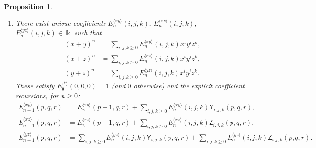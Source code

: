 \documentclass{amsart}
\newtheorem{proposition}[theorem]{Proposition}
\theoremstyle{definition}
\theoremstyle{remark}
\numberwithin{equation}{section}
\begin{document}
\begin{proposition}
\begin{enumerate}
\item[\rm (5)] There exist unique coefficients $E^{\langle xy\rangle}_{n}(i,j,k)$, $E^{\langle xz\rangle}_{n}(i,j,k)$, $E^{\langle yz\rangle}_{n}(i,j,k)\in\Bbbk$ such that
\begin{align}
(x+y)^n&=\sum_{i,j,k\ge 0}E^{\langle xy\rangle}_{n}(i,j,k)x^i y^j z^k,\label{Exycase4}\\
(x+z)^n&=\sum_{i,j,k\ge 0}E^{\langle xz\rangle}_{n}(i,j,k)x^i y^j z^k,\label{Exzcase4}\\
(y+z)^n&=\sum_{i,j,k\ge 0}E^{\langle yz\rangle}_{n}(i,j,k)x^i y^j z^k.\label{Eyzcase4}
\end{align}
These satisfy $E^{\langle\ast\rangle}_{0}(0,0,0)=1$ {\rm (}and $0$ otherwise{\rm )} and the explicit coefficient recursions, for $n\ge 0$:
\begin{equation}\label{binreccase4}
\begin{aligned}
E^{\langle xy\rangle}_{n+1}(p,q,r) & = E^{\langle xy\rangle}_{n}(p-1,q,r)+\sum_{i,j,k\ge 0}E^{\langle xy\rangle}_{n}(i,j,k)\mathsf Y_{i,j,k}(p,q,r),\\
E^{\langle xz\rangle}_{n+1}(p,q,r) & = E^{\langle xz\rangle}_{n}(p-1,q,r)+\sum_{i,j,k\ge 0}E^{\langle xz\rangle}_{n}(i,j,k)\mathsf Z_{i,j,k}(p,q,r),\\
E^{\langle yz\rangle}_{n+1}(p,q,r) & = \sum_{i,j,k\ge 0}E^{\langle yz\rangle}_{n}(i,j,k)\mathsf Y_{i,j,k}(p,q,r) +\sum_{i,j,k\ge 0}E^{\langle yz\rangle}_{n}(i,j,k)\mathsf Z_{i,j,k}(p,q,r).
\end{aligned}
\end{equation}
\end{enumerate}
\end{proposition}
\end{document}
